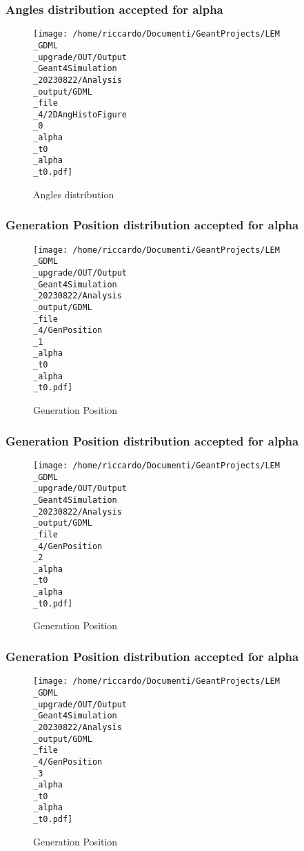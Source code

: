 \documentclass[8pt]{beamer}
\begin{document}
            \begin{frame}
                \frametitle{Angles distribution accepted for alpha}
            
        \begin{figure}[h]
            \centering
            \texttt{[image: /home/riccardo/Documenti/GeantProjects/LEM\\\_GDML\\\_upgrade/OUT/Output\\\_Geant4Simulation\\\_20230822/Analysis\\\_output/GDML\\\_file\\\_4/2DAngHistoFigure\\\_0\\\_alpha\\\_t0\\\_alpha\\\_t0.pdf]}
            \caption{Angles distribution}
        \end{figure}
        
            \end{frame}
            
            \begin{frame}
                \frametitle{Generation Position distribution accepted for alpha}
            
        \begin{figure}[h]
            \centering
            \texttt{[image: /home/riccardo/Documenti/GeantProjects/LEM\\\_GDML\\\_upgrade/OUT/Output\\\_Geant4Simulation\\\_20230822/Analysis\\\_output/GDML\\\_file\\\_4/GenPosition\\\_1\\\_alpha\\\_t0\\\_alpha\\\_t0.pdf]}
            \caption{Generation Position}
        \end{figure}
        
            \end{frame}
            
            \begin{frame}
                \frametitle{Generation Position distribution accepted for alpha}
            
        \begin{figure}[h]
            \centering
            \texttt{[image: /home/riccardo/Documenti/GeantProjects/LEM\\\_GDML\\\_upgrade/OUT/Output\\\_Geant4Simulation\\\_20230822/Analysis\\\_output/GDML\\\_file\\\_4/GenPosition\\\_2\\\_alpha\\\_t0\\\_alpha\\\_t0.pdf]}
            \caption{Generation Position}
        \end{figure}
        
            \end{frame}
            
            \begin{frame}
                \frametitle{Generation Position distribution accepted for alpha}
            
        \begin{figure}[h]
            \centering
            \texttt{[image: /home/riccardo/Documenti/GeantProjects/LEM\\\_GDML\\\_upgrade/OUT/Output\\\_Geant4Simulation\\\_20230822/Analysis\\\_output/GDML\\\_file\\\_4/GenPosition\\\_3\\\_alpha\\\_t0\\\_alpha\\\_t0.pdf]}
            \caption{Generation Position}
        \end{figure}
        
            \end{frame}
            
\end{document}
